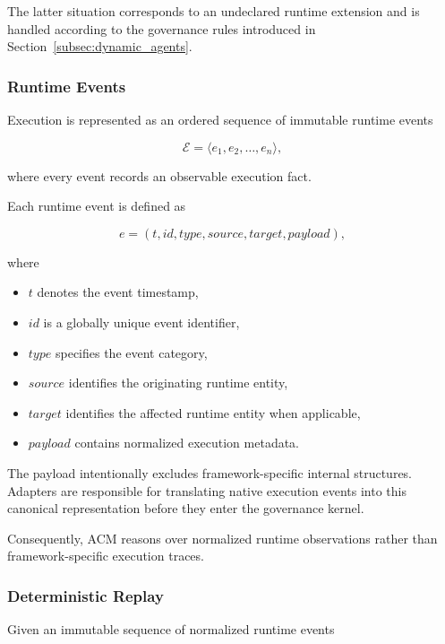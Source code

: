 \documentclass[10pt]{article}
\begin{document}
The latter situation corresponds to an undeclared runtime extension and is
handled according to the governance rules introduced in
Section~\ref{subsec:dynamic_agents}.

\subsubsection{Runtime Events}

Execution is represented as an ordered sequence of immutable runtime events

\[
\mathcal{E}
=
\langle
e_1,
e_2,
\dots,
e_n
\rangle,
\tag{27}
\]

where every event records an observable execution fact.

Each runtime event is defined as

\[
e=
(
t,
id,
type,
source,
target,
payload
),
\tag{28}
\]

where

\begin{itemize}
\item $t$ denotes the event timestamp,
\item $id$ is a globally unique event identifier,
\item $type$ specifies the event category,
\item $source$ identifies the originating runtime entity,
\item $target$ identifies the affected runtime entity when applicable,
\item $payload$ contains normalized execution metadata.
\end{itemize}

The payload intentionally excludes framework-specific internal structures.
Adapters are responsible for translating native execution events into this
canonical representation before they enter the governance kernel.

Consequently, ACM reasons over normalized runtime observations rather than
framework-specific execution traces.

\subsubsection{Deterministic Replay}

Given an immutable sequence of normalized runtime events
\end{document}
